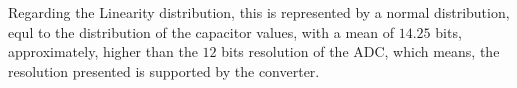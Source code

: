 Regarding the Linearity distribution, this is represented by a normal distribution, equl to the distribution of the capacitor values, with a mean of $14.25$ bits, approximately, higher than the $12$ bits resolution of the ADC, which means, the resolution presented is supported by the converter.

